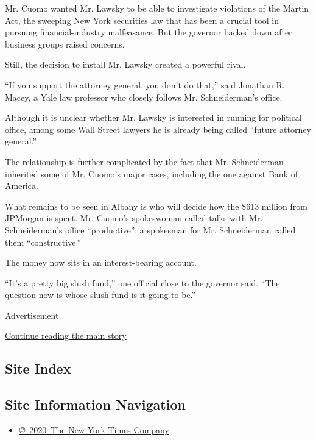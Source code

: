 Mr. Cuomo wanted Mr. Lawsky to be able to investigate violations of the
Martin Act, the sweeping New York securities law that has been a crucial
tool in pursuing financial-industry malfeasance. But the governor backed
down after business groups raised concerns.

Still, the decision to install Mr. Lawsky created a powerful rival.

``If you support the attorney general, you don't do that,'' said
Jonathan R. Macey, a Yale law professor who closely follows Mr.
Schneiderman's office.

Although it is unclear whether Mr. Lawsky is interested in running for
political office, among some Wall Street lawyers he is already being
called ``future attorney general.''

The relationship is further complicated by the fact that Mr.
Schneiderman inherited some of Mr. Cuomo's major cases, including the
one against Bank of America.

What remains to be seen in Albany is who will decide how the \$613
million from JPMorgan is spent. Mr. Cuomo's spokeswoman called talks
with Mr. Schneiderman's office ``productive''; a spokesman for Mr.
Schneiderman called them ``constructive.''

The money now sits in an interest-bearing account.

``It's a pretty big slush fund,'' one official close to the governor
said. ``The question now is whose slush fund is it going to be.''

Advertisement

\protect\hyperlink{after-bottom}{Continue reading the main story}

\hypertarget{site-index}{%
\subsection{Site Index}\label{site-index}}

\hypertarget{site-information-navigation}{%
\subsection{Site Information
Navigation}\label{site-information-navigation}}

\begin{itemize}
\tightlist
\item
  \href{https://help.nytimes3xbfgragh.onion/hc/en-us/articles/115014792127-Copyright-notice}{©~2020~The
  New York Times Company}
\end{itemize}

